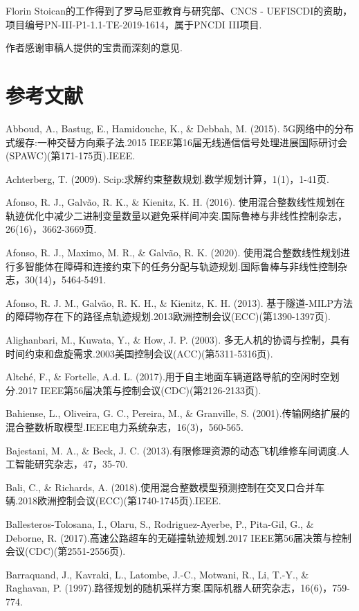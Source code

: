\documentclass[10pt]{article}
\begin{document}
Florin Stoican的工作得到了罗马尼亚教育与研究部、CNCS - UEFISCDI的资助，项目编号PN-III-P1-1.1-TE-2019-1614，属于PNCDI III项目.

作者感谢审稿人提供的宝贵而深刻的意见.

\section*{参考文献}

Abboud, A., Bastug, E., Hamidouche, K., \& Debbah, M. (2015). 5G网络中的分布式缓存:一种交替方向乘子法.2015 IEEE第16届无线通信信号处理进展国际研讨会(SPAWC)(第171-175页).IEEE.

Achterberg, T. (2009). Scip:求解约束整数规划.数学规划计算，1(1)，1-41页.

Afonso, R. J., Galvão, R. K., \& Kienitz, K. H. (2016). 使用混合整数线性规划在轨迹优化中减少二进制变量数量以避免采样间冲突.国际鲁棒与非线性控制杂志，26(16)，3662-3669页.

Afonso, R. J., Maximo, M. R., \& Galvão, R. K. (2020). 使用混合整数线性规划进行多智能体在障碍和连接约束下的任务分配与轨迹规划.国际鲁棒与非线性控制杂志，30(14)，5464-5491.

Afonso, R. J. M., Galvão, R. K. H., \& Kienitz, K. H. (2013). 基于隧道-MILP方法的障碍物存在下的路径点轨迹规划.2013欧洲控制会议(ECC)(第1390-1397页).

Alighanbari, M., Kuwata, Y., \& How, J. P. (2003). 多无人机的协调与控制，具有时间约束和盘旋需求.2003美国控制会议(ACC)(第5311-5316页).

Altché, F., \& Fortelle, A.d. L. (2017).用于自主地面车辆道路导航的空闲时空划分.2017 IEEE第56届决策与控制会议(CDC)(第2126-2133页).

Bahiense, L., Oliveira, G. C., Pereira, M., \& Granville, S. (2001).传输网络扩展的混合整数析取模型.IEEE电力系统杂志，16(3)，560-565.

Bajestani, M. A., \& Beck, J. C. (2013).有限修理资源的动态飞机维修车间调度.人工智能研究杂志，47，35-70.

Bali, C., \& Richards, A. (2018).使用混合整数模型预测控制在交叉口合并车辆.2018欧洲控制会议(ECC)(第1740-1745页).IEEE.

Ballesteros-Tolosana, I., Olaru, S., Rodriguez-Ayerbe, P., Pita-Gil, G., \& Deborne, R. (2017).高速公路超车的无碰撞轨迹规划.2017 IEEE第56届决策与控制会议(CDC)(第2551-2556页).

Barraquand, J., Kavraki, L., Latombe, J.-C., Motwani, R., Li, T.-Y., \& Raghavan, P. (1997).路径规划的随机采样方案.国际机器人研究杂志，16(6)，759-774.
\end{document}
